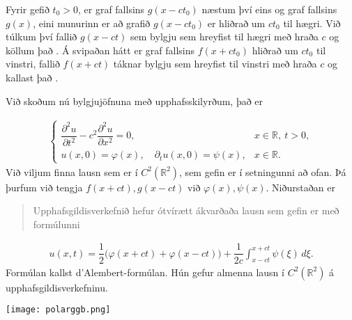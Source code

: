 \documentclass[a4paper,10pt,icelandic]{sphinxmanual}
\begin{document}
Fyrir gefið \(t_0 > 0\), er graf fallsins \(g(x − ct_0)\) næstum því eins og graf fallsins \(g(x)\), eini munurinn er að grafið \(g(x − ct_0)\) er hliðrað um \(c t_0\) til hægri. Við túlkum því fallið \(g(x − ct)\) sem bylgju sem hreyfist til hægri með hraða \(c\) og köllum það . Á svipaðan hátt er graf fallsins \(f(x+ct_0)\) hliðrað um \(c t_0\) til vinstri, fallið \(f(x + ct)\) táknar bylgju sem hreyfist til vinstri með hraða \(c\) og kallast það .

Við skoðum nú bylgjujöfnuna með upphafsskilyrðum, það er

\label{\detokenize{Kafli04:upphafbylgja}}\begin{equation*}
\begin{split}\begin{cases}
\dfrac{\partial^2u}{\partial t^2}
-c^2\dfrac{\partial^2u}{\partial x^2}=0, &x\in {{\mathbb  R}},\ t>0, \\
u(x,0)=\varphi(x), \quad \partial_tu(x,0)=\psi(x), &x\in {{\mathbb  R}}.
\end{cases}\end{split}
\end{equation*}
Við viljum finna lausn sem er í \(C^2({{\mathbb R}}^2)\), sem gefin er í setningunni að ofan. Þá þurfum við tengja \(f(x+ct), g(x-ct)\) við \(\varphi(x), \psi(x)\).
Niðurstaðan er

\begin{quote}

Upphafsgildisverkefnið {\hyperref[\detokenize{Kafli04:upphafbylgja}]{}} hefur ótvírætt ákvarðaða lausn sem gefin er með formúlunni
\end{quote}
\begin{equation*}
\begin{split}u(x,t)=\dfrac 12\big(\varphi(x+ct)+\varphi(x-ct)\big)
+\dfrac 1{2c}\int_{x-ct}^{x+ct}\psi({\xi})\, d{\xi}.\end{split}
\end{equation*}
Formúlan kallst d’Alembert-formúlan. Hún gefur almenna lausn í \(C^2({{\mathbb R}}^2)\) á upphafsgildisverkefninu.

\begin{DUlineblock}{0em}
\item[] 
\item[] 
\end{DUlineblock}


\begin{center}
\texttt{[image: polarggb.png]}
\end{center}
\end{document}
